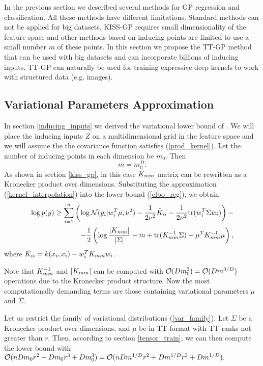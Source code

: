 In the previous section we described several methods for GP regression and 
classification. All these methods have different limitations. Standard methods
can not be applied for big datasets, KISS-GP requires small dimensionality of
the feature space and other methods based on inducing points are limited to use
a small number $m$ of these points. In this section we propose the TT-GP method
that can be used with big datasets and can incorporate billions of inducing 
inputs. TT-GP can naturally be used for training expressive deep kernels to work
with structured data (e.g. images).

\subsection{Variational Parameters Approximation}
  In section \ref{inducing_inputs} we derived the variational lower bound of
  \citet{hensman2013}. We will place the inducing inputs $Z$ on a 
  multidimensional grid in the feature space and we will assume the the
  covariance function satisfies (\ref{prod_kernel}). Let the number
  of inducing points in each dimension be $m_0$. Then
  \[
    m = m_0^D.
  \]
  As shown in section \ref{kiss_gp},
  in this case $K_{mm}$ matrix can be rewritten as a Kronecker product over 
  dimensions. Substituting the approximation (\ref{kernel_interpolation}) into
  the lower bound (\ref{elbo_reg}), we obtain 
  \begin{equation}
  \label{kissgp_elbo}
    \begin{split}
      \log p(y) \ge 
      \sum_{i=1}^n \left ( \log \mathcal{N} (y_i | w_i^T \mu, \nu^2) - 
        \frac 1 {2\nu^2} \tilde K_{ii} - 
        \frac 1 {2\nu^2} \mbox{tr} (w_i^T \Sigma w_i)
      \right )-
      \\
      - \frac 1 2 \left(
        \log \frac {|K_{mm}|} {|\Sigma|} - m + \mbox{tr}(K_{mm}^{-1} \Sigma) +
        \mu^T K_{mm}^{-1} \mu
      \right),
    \end{split}
  \end{equation}
  where $\tilde K_{ii} = k(x_i, x_i) - w_i^T K_{mm} w_i$.

  Note that $K_{mm}^{-1}$ and $|K_{mm}|$ can be computed with 
  $\mathcal{O}(D m_0^3) = \mathcal{O}(D m^{3/D})$ operations due to the 
  Kronecker product structure. Now the most computationally demanding terms 
  are those containing variational parameters $\mu$ and $\Sigma$.

  Let us restrict the family of variational distributions (\ref{var_family}). Let $\Sigma$ be
  a Kronecker product over dimensions, and $\mu$ be in TT-format with TT-ranks
  not greater than $r$. Then, according to section \ref{tensor_train}, we can 
  then compute the lower bound with 
  $\mathcal{O}(nDm_0 r^2 + D m_0 r^3 + Dm_0^3) = 
  \mathcal{O}(nD m^{1/D} r^2 + D m^{1/D} r^3 + D m^{1/D}).$ 
  
